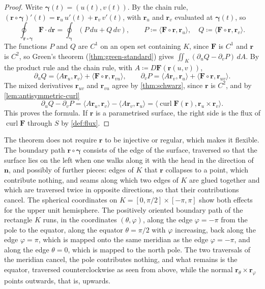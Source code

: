 \begin{proof}
Write $\boldsymbol\gamma(t)=(u(t),v(t))$. By the chain rule, $(\mathbf r\circ\boldsymbol\gamma)'(t)=\mathbf r_u\,u'(t)+\mathbf r_v\,v'(t)$, with $\mathbf r_u$ and $\mathbf r_v$ evaluated at $\boldsymbol\gamma(t)$, so
\[
\oint_{\mathbf r\circ\boldsymbol\gamma}\mathbf F\cdot d\mathbf r=\oint_{\boldsymbol\gamma}(P\,du+Q\,dv),\qquad P\coloneqq\langle\mathbf F\circ\mathbf r,\mathbf r_u\rangle,\quad Q\coloneqq\langle\mathbf F\circ\mathbf r,\mathbf r_v\rangle .
\]
The functions $P$ and $Q$ are $C^1$ on an open set containing $K$, since $\mathbf F$ is $C^1$ and $\mathbf r$ is $C^2$, so Green's theorem (\cref{thm:green-standard}) gives $\iint_K(\partial_uQ-\partial_vP)\,dA$. By the product rule and the chain rule, with $A\coloneqq D\mathbf F(\mathbf r(u,v))$,
\[
\partial_uQ=\langle A\mathbf r_u,\mathbf r_v\rangle+\langle\mathbf F\circ\mathbf r,\mathbf r_{vu}\rangle,\qquad\partial_vP=\langle A\mathbf r_v,\mathbf r_u\rangle+\langle\mathbf F\circ\mathbf r,\mathbf r_{uv}\rangle .
\]
The mixed derivatives $\mathbf r_{uv}$ and $\mathbf r_{vu}$ agree by \cref{thm:schwarz}, since $\mathbf r$ is $C^2$, and by \cref{lem:antisymmetric-curl}
\[
\partial_uQ-\partial_vP=\langle A\mathbf r_u,\mathbf r_v\rangle-\langle A\mathbf r_v,\mathbf r_u\rangle=\bigl\langle\operatorname{curl}\mathbf F(\mathbf r),\mathbf r_u\times\mathbf r_v\bigr\rangle .
\]
This proves the formula. If $\mathbf r$ is a parametrised surface, the right side is the flux of $\operatorname{curl}\mathbf F$ through $S$ by \cref{def:flux}.
\end{proof}

The theorem does not require $\mathbf r$ to be injective or regular, which makes it flexible. The boundary path $\mathbf r\circ\boldsymbol\gamma$ consists of the edge of the surface, traversed so that the surface lies on the left when one walks along it with the head in the direction of $\mathbf n$, and possibly of further pieces: edges of $K$ that $\mathbf r$ collapses to a point, which contribute nothing, and seams along which two edges of $K$ are glued together and which are traversed twice in opposite directions, so that their contributions cancel. The spherical coordinates on $K=[0,\pi/2]\times[-\pi,\pi]$ show both effects for the upper unit hemisphere. The positively oriented boundary path of the rectangle $K$ runs, in the coordinates $(\theta,\varphi)$, along the edge $\varphi=-\pi$ from the pole to the equator, along the equator $\theta=\pi/2$ with $\varphi$ increasing, back along the edge $\varphi=\pi$, which is mapped onto the same meridian as the edge $\varphi=-\pi$, and along the edge $\theta=0$, which is mapped to the north pole. The two traversals of the meridian cancel, the pole contributes nothing, and what remains is the equator, traversed counterclockwise as seen from above, while the normal $\mathbf r_\theta\times\mathbf r_\varphi$ points outwards, that is, upwards.

